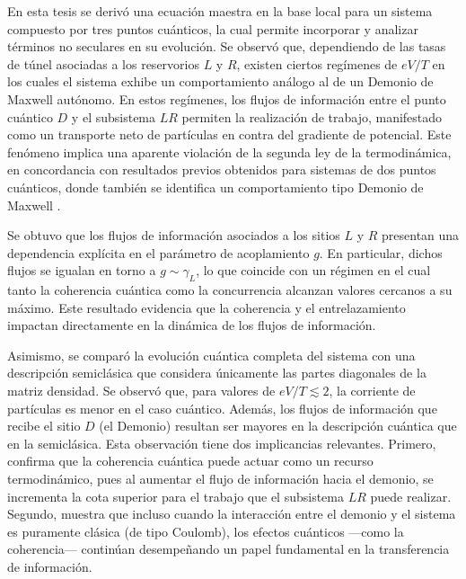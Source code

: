 En esta tesis se derivó una ecuación maestra en la base local para un sistema compuesto por tres puntos cuánticos, la cual permite incorporar y analizar términos no seculares en su evolución. Se observó que, dependiendo de las tasas de túnel asociadas a los reservorios $L$ y $R$, existen ciertos regímenes de $eV/T$ en los cuales el sistema exhibe un comportamiento análogo al de un Demonio de Maxwell autónomo. En estos regímenes, los flujos de información entre el punto cuántico $D$ y el subsistema $LR$ permiten la realización de trabajo, manifestado como un transporte neto de partículas en contra del gradiente de potencial. Este fenómeno implica una aparente violación de la segunda ley de la termodinámica, en concordancia con resultados previos obtenidos para sistemas de dos puntos cuánticos, donde también se identifica un comportamiento tipo Demonio de Maxwell \cite{horowitz2014thermodynamics}.

Se obtuvo que los flujos de información asociados a los sitios $L$ y $R$ presentan una dependencia explícita en el parámetro de acoplamiento $g$. En particular, dichos flujos se igualan en torno a $g \sim \gamma_L$, lo que coincide con un régimen en el cual tanto la coherencia cuántica como la concurrencia alcanzan valores cercanos a su máximo. Este resultado evidencia que la coherencia y el entrelazamiento impactan directamente en la dinámica de los flujos de información.

Asimismo, se comparó la evolución cuántica completa del sistema con una descripción semiclásica que considera únicamente las partes diagonales de la matriz densidad. Se observó que, para valores de $eV/T \lesssim 2$, la corriente de partículas es menor en el caso cuántico. Además, los flujos de información que recibe el sitio $D$ (el Demonio) resultan ser mayores en la descripción cuántica que en la semiclásica. Esta observación tiene dos implicancias relevantes. Primero, confirma que la coherencia cuántica puede actuar como un recurso termodinámico, pues al aumentar el flujo de información hacia el demonio, se incrementa la cota superior para el trabajo que el subsistema $LR$ puede realizar. Segundo, muestra que incluso cuando la interacción entre el demonio y el sistema es puramente clásica (de tipo Coulomb), los efectos cuánticos —como la coherencia— continúan desempeñando un papel fundamental en la transferencia de información.


